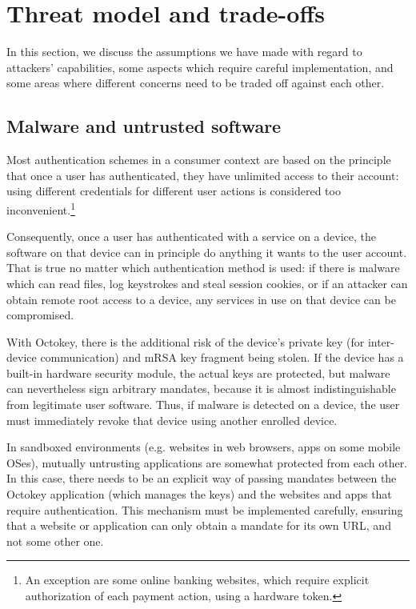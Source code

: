 \section{Threat model and trade-offs}\label{sec:threat}

In this section, we discuss the assumptions we have made with regard to attackers' capabilities,
some aspects which require careful implementation, and some areas where different concerns need to
be traded off against each other.

\subsection{Malware and untrusted software}\label{sec:malware}

Most authentication schemes in a consumer context are based on the principle that once a user has
authenticated, they have unlimited access to their account: using different credentials for
different user actions is considered too inconvenient.\footnote{An exception are some online banking
websites, which require explicit authorization of each payment action, using a hardware token.}

Consequently, once a user has authenticated with a service on a device, the software on that device
can in principle do anything it wants to the user account. That is true no matter which
authentication method is used: if there is malware which can read files, log keystrokes and steal
session cookies, or if an attacker can obtain remote root access to a device, any services in use on
that device can be compromised.

With Octokey, there is the additional risk of the device's private key (for inter-device
communication) and mRSA key fragment being stolen. If the device has a built-in hardware security
module, the actual keys are protected, but malware can nevertheless sign arbitrary mandates, because
it is almost indistinguishable from legitimate user software. Thus, if malware is detected on a
device, the user must immediately revoke that device using another enrolled device.

In sandboxed environments (e.g. websites in web browsers, apps on some mobile OSes), mutually
untrusting applications are somewhat protected from each other. In this case, there needs to be an
explicit way of passing mandates between the Octokey application (which manages the keys) and the
websites and apps that require authentication. This mechanism must be implemented carefully,
ensuring that a website or application can only obtain a mandate for its own URL, and not some other
one.

